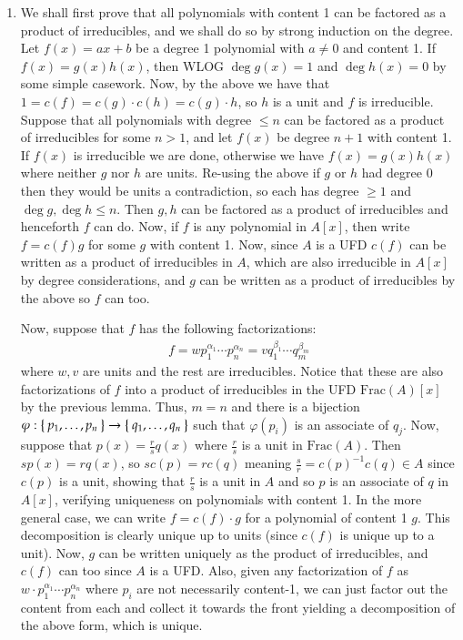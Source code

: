 \documentclass[12pt]{article}
\theoremstyle{definitionstyle}
\def \cph{\varphi}
\begin{document}
\begin{enumerate}[leftmargin=\labelsep]
		\item We shall first prove that all polynomials with content 1 can be factored as a product of irreducibles, and we shall do so by strong induction on the degree. Let $f(x) = ax + b$ be a degree 1 polynomial with $a \neq 0$ and content 1. If $f(x) = g(x)h(x)$, then WLOG $\deg g(x) = 1$ and $\deg h(x) = 0$ by some simple casework. Now, by the above we have that $1 = c(f) = c(g) \cdot c(h) = c(g) \cdot h$, so $h$ is a unit and $f$ is irreducible. Suppose that all polynomials with degree $\leq n$ can be factored as a product of irreducibles for some $n > 1$, and let $f(x)$ be degree $n+1$ with content 1. If $f(x)$ is irreducible we are done, otherwise we have $f(x) = g(x)h(x)$ where neither $g$ nor $h$ are units. Re-using the above if $g$ or $h$ had degree 0 then they would be units a contradiction, so each has degree $\geq 1$ and $\deg g, \deg h \leq n$. Then $g, h$ can be factored as a product of irreducibles and henceforth $f$ can do. Now, if $f$ is any polynomial in $A[x]$, then write $f = c(f)g$ for some $g$ with content 1. Now, since $A$ is a UFD $c(f)$ can be written as a product of irreducibles in $A$, which are also irreducible in $A[x]$ by degree considerations, and $g$ can be written as a product of irreducibles by the above so $f$ can too.
		
		Now, suppose that $f$ has the following  factorizations:
		\begin{align*}
			f = wp_1^{\alpha_1} \cdots p_n^{\alpha_n} = vq_1^{\beta_1} \cdots q_m^{\beta_m}
		\end{align*}
		where $w,v$ are units and the rest are irreducibles. Notice that these are also factorizations of $f$ into a product of irreducibles in the UFD $\mathrm{Frac}(A)[x]$ by the previous lemma. Thus, $m = n$ and there is a bijection $\cph: \Set{p_1, \ldots, p_n} \to \Set{q_1, \ldots, q_n}$ such that $\cph(p_i)$ is an associate of $q_j$. Now, suppose that $p(x) = \frac rs q(x)$ where $\frac rs$ is a unit in $\mathrm{Frac}(A)$. Then $sp(x) = rq(x)$, so $sc(p) = rc(q)$ meaning $\frac{s}{r} = c(p)^{-1}c(q) \in A$ since $c(p)$ is a unit, showing that $\frac rs$ is a unit in $A$ and so $p$ is an associate of $q$ in $A[x]$, verifying uniqueness on polynomials with content 1. In the more general case, we can write $f = c(f) \cdot g$ for a polynomial of content 1 $g$. This decomposition is clearly unique up to units (since $c(f)$ is unique up to a unit). Now, $g$ can be written uniquely as the product of irreducibles, and $c(f)$ can too since $A$ is a UFD. Also, given any factorization of $f$ as $w \cdot p_1^{\alpha_1} \cdots p_n^{\alpha_n}$ where $p_i$ are not necessarily content-1, we can just factor out the content from each and collect it towards the front yielding a decomposition of the above form, which is unique. 
		

\end{enumerate}
\end{document}

